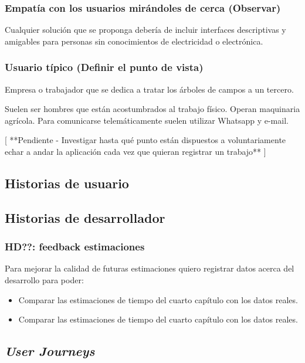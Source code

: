 \subsubsection{Empatía con los usuarios mirándoles de cerca (Observar)}

Cualquier solución que se proponga debería de incluir interfaces
descriptivas y amigables para personas sin conocimientos de
electricidad o electrónica.

\subsubsection{Usuario típico (Definir el punto de vista)}

Empresa o trabajador que se dedica a tratar los árboles de campos a un tercero.

Suelen ser hombres que están acostumbrados al trabajo físico. Operan maquinaria
agrícola. Para comunicarse telemáticamente suelen utilizar Whatsapp y e-mail.

[ **Pendiente - Investigar hasta qué punto están dispuestos a voluntariamente
echar a andar la aplicación cada vez que quieran registrar un trabajo** ]

\subsection{Historias de usuario}

\subsection{Historias de desarrollador}

\subsubsection{HD??: feedback estimaciones}
Para mejorar la calidad de futuras estimaciones quiero registrar datos acerca del desarrollo
para poder:

\begin{itemize}
   \item Comparar las estimaciones de tiempo del cuarto capítulo con los datos reales.
   \item Comparar las estimaciones de tiempo del cuarto capítulo con los datos reales.
\end{itemize}

\subsection{\textit{User Journeys}}

